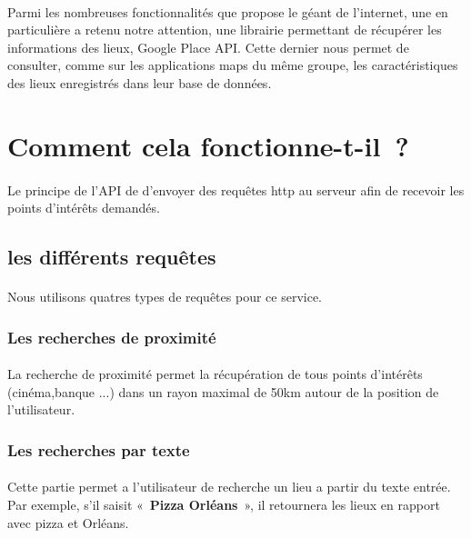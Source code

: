 \paragraph{}
Parmi les nombreuses fonctionnalités que propose le géant de l'internet, une en particulière a retenu notre attention, une librairie permettant de récupérer les informations des lieux, Google Place API. Cette dernier nous permet de consulter, comme sur les applications maps du même groupe, les caractéristiques des lieux enregistrés dans leur base de données.

\section*{Comment cela fonctionne-t-il ?}
\paragraph{}
Le principe de l'API de d'envoyer des requêtes http au serveur afin de recevoir les points d'intérêts demandés.

\subsection*{les différents requêtes}
\paragraph{}
Nous utilisons quatres types de requêtes pour ce service.

\subsubsection*{Les recherches de proximité}
\paragraph{}
La recherche de proximité permet la récupération de tous points d'intérêts (cinéma,banque ...) dans un rayon maximal de 50km autour de la position de l'utilisateur.

\subsubsection*{Les recherches par texte}
\paragraph{}
Cette partie permet a l'utilisateur de recherche un lieu a partir du texte entrée.
Par exemple, s'il saisit « \textbf{Pizza Orléans} », il retournera les lieux en rapport avec pizza et Orléans.

